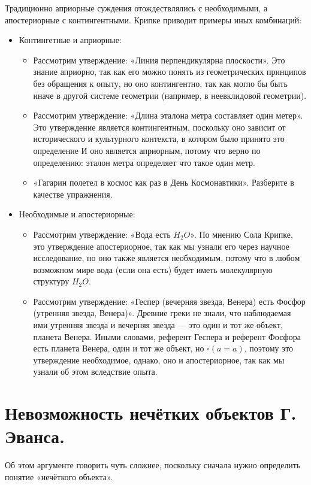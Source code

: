 \documentclass[openany]{book}
\theoremstyle{plain}
\theoremstyle{definition}
\begin{document}
Традиционно априорные суждения отождествлялись с необходимыми, а апостериорные с контингентными.
Крипке приводит примеры иных комбинаций:
\begin{itemize}
\item Контингетные и априорные:
	\begin{itemize}
		\item Рассмотрим утверждение: «Линия перпендикулярна плоскости». Это знание априорно, так как его можно понять из геометрических принципов без обращения к опыту, но оно контингентно, так как могло бы быть иначе в другой системе геометрии (например, в неевклидовой геометрии).
		\item Рассмотрим утверждение: «Длина эталона метра составляет один метер». Это утверждение является контингентным, поскольку оно зависит от исторического и культурного контекста, в котором было принято это определение И оно является априорным, потому что верно по определению: эталон метра определяет что такое один метр.
		\item «Гагарин полетел в космос как раз в День Космонавтики». Разберите в качестве упражнения.
	\end{itemize}
\item Необходимые и апостериорные:
	\begin{itemize}
		\item Рассмотрим утверждение: «Вода есть \(H_2 O\)». По мнению Сола Крипке, это утверждение апостериорное, так как мы узнали его через научное исследование, но оно также является необходимым, потому что в любом возможном мире вода (если она есть) будет иметь молекулярную структуру \(H_2 O\).
		\item Рассмотрим утверждение: «Геспер (вечерняя звезда, Венера) есть Фосфор (утренняя звезда, Венера)». Древние греки не знали, что наблюдаемая ими утренняя звезда и вечерняя звезда — это один и тот же объект, планета Венера. Иными словами, референт Геспера и референт Фосфора есть планета Венера, один и тот же объект, но \(\square(a = a)\), поэтому это утверждение необходимое, однако, оно и апостериорное, так как мы узнали об этом вследствие опыта.
	\end{itemize}
\end{itemize}


\section{Невозможность нечётких объектов Г. Эванса.}

Об этом аргументе говорить чуть сложнее, поскольку сначала нужно определить понятие «нечёткого объекта».
\end{document}
